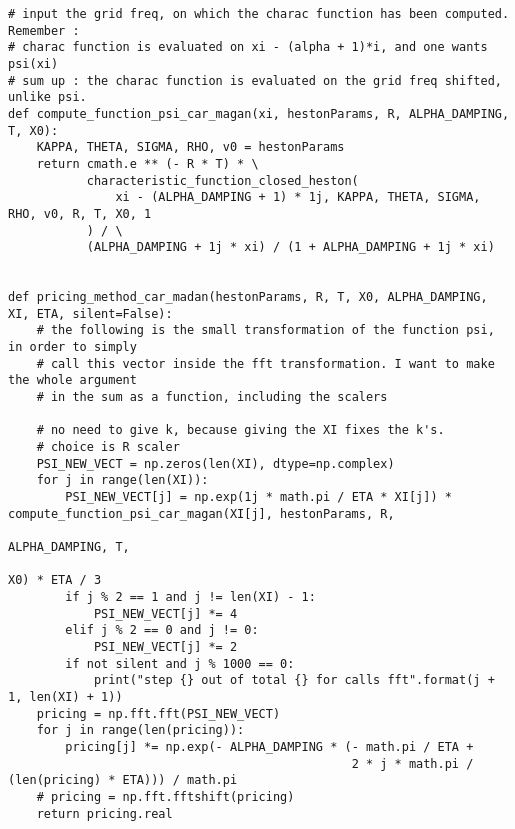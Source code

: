 \begin{Verbatim}[fontsize=\tiny]
# input the grid freq, on which the charac function has been computed. Remember :
# charac function is evaluated on xi - (alpha + 1)*i, and one wants psi(xi)
# sum up : the charac function is evaluated on the grid freq shifted, unlike psi.
def compute_function_psi_car_magan(xi, hestonParams, R, ALPHA_DAMPING, T, X0):
    KAPPA, THETA, SIGMA, RHO, v0 = hestonParams
    return cmath.e ** (- R * T) * \
           characteristic_function_closed_heston(
               xi - (ALPHA_DAMPING + 1) * 1j, KAPPA, THETA, SIGMA, RHO, v0, R, T, X0, 1
           ) / \
           (ALPHA_DAMPING + 1j * xi) / (1 + ALPHA_DAMPING + 1j * xi)


def pricing_method_car_madan(hestonParams, R, T, X0, ALPHA_DAMPING, XI, ETA, silent=False):
    # the following is the small transformation of the function psi, in order to simply
    # call this vector inside the fft transformation. I want to make the whole argument
    # in the sum as a function, including the scalers

    # no need to give k, because giving the XI fixes the k's.
    # choice is R scaler
    PSI_NEW_VECT = np.zeros(len(XI), dtype=np.complex)
    for j in range(len(XI)):
        PSI_NEW_VECT[j] = np.exp(1j * math.pi / ETA * XI[j]) * compute_function_psi_car_magan(XI[j], hestonParams, R,
                                                                                              ALPHA_DAMPING, T,
                                                                                              X0) * ETA / 3
        if j % 2 == 1 and j != len(XI) - 1:
            PSI_NEW_VECT[j] *= 4
        elif j % 2 == 0 and j != 0:
            PSI_NEW_VECT[j] *= 2
        if not silent and j % 1000 == 0:
            print("step {} out of total {} for calls fft".format(j + 1, len(XI) + 1))
    pricing = np.fft.fft(PSI_NEW_VECT)
    for j in range(len(pricing)):
        pricing[j] *= np.exp(- ALPHA_DAMPING * (- math.pi / ETA +
                                                2 * j * math.pi / (len(pricing) * ETA))) / math.pi
    # pricing = np.fft.fftshift(pricing)
    return pricing.real
    
\end{Verbatim}


